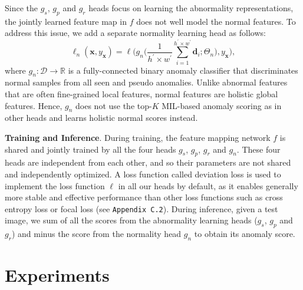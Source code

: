 \documentclass[10pt,twocolumn,letterpaper]{article}
\newcommand{\yxvec}{{y_{\mathbf{x}}}}
\begin{document}
Since the $g_s$, $g_p$ and $g_r$ heads focus on learning the abnormality representations, the jointly learned feature map in $f$ does not well model the normal features. To address this issue, we add a separate normality learning head as follows:
\begin{equation}
    \ell_{n}(\mathbf{x}, \yxvec) = \ell\Big(g_n\big(\frac{1}{h^\prime\times w^\prime}\sum_{i=1}^{h^\prime \times w^\prime} \mathbf{d}_i; \Theta_{n}\big), \yxvec\Big),
\end{equation}
where $g_n: \mathcal{D}\rightarrow\mathbb{R}$ is a fully-connected binary anomaly classifier that discriminates normal samples from all seen and pseudo anomalies. Unlike abnormal features that are often fine-grained local features, normal features are holistic global features. Hence, 
$g_n$ does not use the top-$K$ MIL-based anomaly scoring as in other heads and learns holistic normal scores instead.

\textbf{Training and Inference}. During training, the feature mapping network $f$ is shared and jointly trained by all the four heads $g_s$, $g_p$, $g_r$ and $g_n$. These four heads are independent from each other, and so their parameters are not shared and independently optimized. A loss function called deviation loss \cite{pang2019deep,pang2021explainable} is used to implement the loss function $\ell$ in all our heads by default, as it enables generally more stable and effective performance than other loss functions such as cross entropy loss or focal loss (see \texttt{Appendix C.2}). During inference, given a test image, we sum of all the scores from the abnormality learning heads ($g_s$, $g_p$ and $g_r$) and minus the score from the normality head $g_n$ to obtain its anomaly score.
\section{Experiments}
\end{document}
